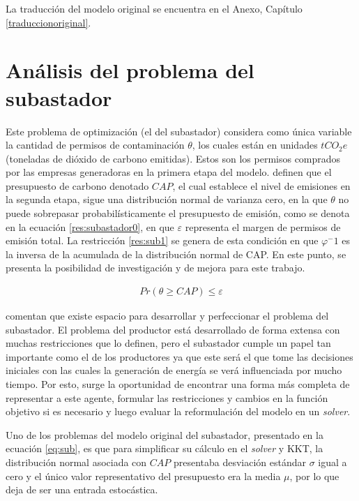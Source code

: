 La traducción del modelo original se encuentra en el Anexo, Capítulo \ref{traduccionoriginal}.

\section{Análisis del problema del subastador}

Este problema de optimización (el del subastador) considera como única variable la cantidad de permisos de contaminación $\theta$, los cuales están en unidades $tCO_2 e$ (toneladas de dióxido de carbono emitidas). Estos son los permisos comprados por las empresas generadoras en la primera etapa del modelo.  definen que el presupuesto de carbono denotado $CAP$, el cual establece el nivel de emisiones en la segunda etapa, sigue una distribución normal de varianza cero, en la que $\theta$ no puede sobrepasar probabilísticamente el presupuesto de emisión, como se denota en la ecuación \ref{res:subastador0}, en que $\varepsilon$ representa el margen de permisos de emisión total. La restricción \ref{res:sub1} se genera de esta condición en que $\varphi^-1$ es la inversa de la acumulada de la distribución normal de CAP. En este punto, se presenta la posibilidad de investigación y de  mejora para este trabajo. 
\vspace{2.5mm}

\begin{equation}
\begin{array}{cl}
    Pr(\theta \geq CAP)\leq \varepsilon \label{res:subastador0}
\end{array}
\end{equation}
\vspace{2.5mm}

 comentan que existe espacio para desarrollar y perfeccionar el problema del subastador. El problema del productor está desarrollado de forma extensa con muchas restricciones que lo definen, pero el subastador cumple un papel tan importante como el de los productores ya que este será el que tome las decisiones iniciales con las cuales la generación de energía se verá influenciada por mucho tiempo.  Por esto, surge la oportunidad de encontrar una forma más completa de representar a este agente, formular las restricciones y cambios en la función objetivo si es necesario y luego evaluar la reformulación del modelo en un \textit{solver}.
\vspace{2.5mm}

Uno de los problemas del modelo original del subastador, presentado en la ecuación \ref{eq:sub}, es que para simplificar su cálculo en el \textit{solver} y KKT, la distribución normal asociada con $CAP$ presentaba desviación estándar $\sigma$ igual a cero y el único valor representativo del presupuesto era la media $\mu$, por lo que deja de ser una entrada estocástica. 
\vspace{2.5mm}

